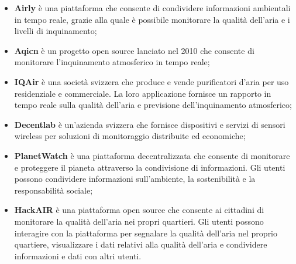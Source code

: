 \begin{itemize}
	\item \textbf{Airly} \cite{airly} è una piattaforma che consente di condividere informazioni ambientali in tempo reale, grazie alla quale è possibile monitorare la qualità dell'aria e i livelli di inquinamento;
	\item \textbf{Aqicn} \cite{aqicn} è un progetto open source lanciato nel 2010 che consente di monitorare l'inquinamento atmosferico in tempo reale;
	\item \textbf{IQAir} \cite{iqair} è una società svizzera che produce e vende purificatori d'aria per uso residenziale e commerciale. La loro applicazione fornisce un rapporto in tempo reale sulla qualità dell'aria e previsione dell'inquinamento atmosferico;
	\item \textbf{Decentlab} \cite{decentlab} è un'azienda svizzera che fornisce dispositivi e servizi di sensori wireless per soluzioni di monitoraggio distribuite ed economiche;
	\item \textbf{PlanetWatch} \cite{planetwatch} è una piattaforma decentralizzata che consente di monitorare e proteggere il pianeta attraverso la condivisione di informazioni. Gli utenti possono condividere informazioni sull'ambiente, la sostenibilità e la responsabilità sociale;
	\item \textbf{HackAIR} \cite{hackair} è una piattaforma open source che consente ai cittadini di monitorare la qualità dell'aria nei propri quartieri. Gli utenti possono interagire con la piattaforma per segnalare la qualità dell'aria nel proprio quartiere, visualizzare i dati relativi alla qualità dell'aria e condividere informazioni e dati con altri utenti.
\end{itemize}
